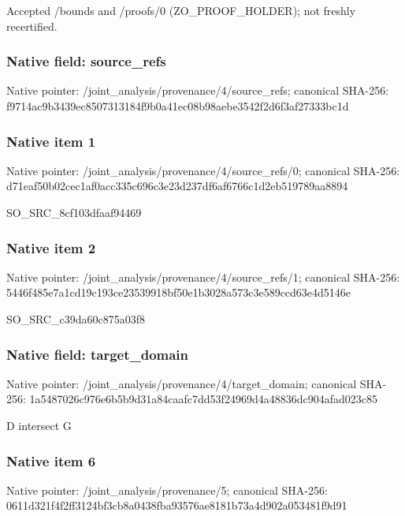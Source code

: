 \documentclass[10pt,a4paper]{article}
\begin{document}
\begingroup\raggedright\sloppy Accepted /\allowbreak{}bounds and /\allowbreak{}proofs/\allowbreak{}0 (ZO\_\allowbreak{}PROOF\_\allowbreak{}HOLDER);\allowbreak{} not freshly recertified.\par\endgroup

\subsubsection{Native field: source\_\allowbreak{}refs}
Native pointer: /joint\_\allowbreak{}analysis/provenance/4/source\_\allowbreak{}refs; canonical SHA-256: f9714ac9b3439ec8507313184f9b0a41ec08b98aebe3542f2d6f3af27333bc1d

\subsubsection{Native item 1}
Native pointer: /joint\_\allowbreak{}analysis/provenance/4/source\_\allowbreak{}refs/0; canonical SHA-256: d71eaf50b02cec1af0acc335c696c3e23d237df6af6766c1d2eb519789aa8894

\begingroup\raggedright\sloppy SO\_\allowbreak{}SRC\_\allowbreak{}8cf103dfaaf94469\par\endgroup

\subsubsection{Native item 2}
Native pointer: /joint\_\allowbreak{}analysis/provenance/4/source\_\allowbreak{}refs/1; canonical SHA-256: 5446f485e7a1cd19c193ce23539918bf50e1b3028a573c3e589ccd63e4d5146e

\begingroup\raggedright\sloppy SO\_\allowbreak{}SRC\_\allowbreak{}c39da60c875a03f8\par\endgroup

\subsubsection{Native field: target\_\allowbreak{}domain}
Native pointer: /joint\_\allowbreak{}analysis/provenance/4/target\_\allowbreak{}domain; canonical SHA-256: 1a5487026c976e6b5b9d31a84caafc7dd53f24969d4a48836dc904afad023c85

\begingroup\raggedright\sloppy D intersect G\par\endgroup

\subsubsection{Native item 6}
Native pointer: /joint\_\allowbreak{}analysis/provenance/5; canonical SHA-256: 0611d321f4f2ff3124bf3cb8a0438fba93576ae8181b73a4d902a053481f9d91
\end{document}
